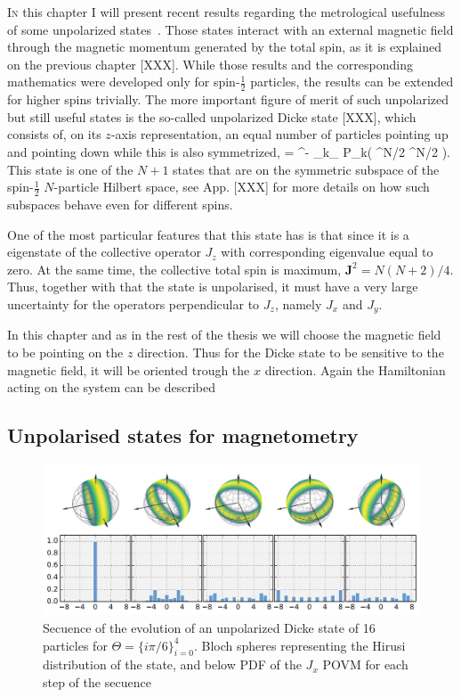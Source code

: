 \lettrine[lines=2, findent=3pt,nindent=0pt]{I}{n} this chapter I will present recent results regarding the metrological usefulness of some unpolarized states~\cite{Apellaniz2015}.
Those states interact with an external magnetic field through the magnetic momentum generated by the total spin, as it is explained on the previous chapter [XXX].
While those results and the corresponding mathematics were developed only for spin-$\frac{1}{2}$ particles, the results can be extended for higher spins trivially.
The more important figure of merit of such unpolarized but still useful states is the so-called unpolarized Dicke state [XXX], which consists of, on its $z$-axis representation, an equal number of particles pointing up and pointing down while this is also symmetrized,
\be
   = ^{-}
  \sum_{k\in \sigma_{}}
  P_k\left( ^{\otimes N/2} ^{\otimes N/2}
  \right).
\ee
This state is one of the $N+1$ states that are on the symmetric subspace of the spin-$\frac{1}{2}$ $N$-particle Hilbert space, see App. [XXX] for more details on how such subspaces behave even for different spins.

One of the most particular features that this state has is that since it is a eigenstate of the collective operator $J_z$ with corresponding eigenvalue equal to zero.
At the same time, the collective total spin is maximum, \ie $\mathbf{J}^2=N(N+2)/4$.
Thus, together with that the state is unpolarised, it must have a very large uncertainty for the operators perpendicular to $J_z$, namely $J_x$ and $J_y$.

In this chapter and as in the rest of the thesis we will choose the magnetic field to be pointing on the $z$ direction.
Thus for the Dicke state to be sensitive to the magnetic field, it will be oriented trough the $x$ direction.
Again the Hamiltonian acting on the system can be described

\subsection{Unpolarised states for magnetometry}

\begin{figure}
  \includegraphics[width=\textwidth]{img/plots/VD_evolution_of_dicke.pdf}
  \caption{Secuence of the evolution of an unpolarized Dicke state of 16 particles for $\Theta=\{i\pi/6\}_{i=0}^4$. Bloch spheres representing the Hirusi distribution of the state, and below PDF of the $J_x$ POVM for each step of the secuence}
\end{figure}

